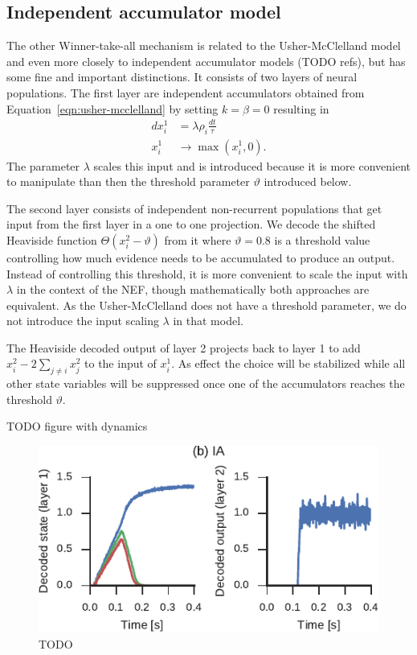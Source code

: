 \documentclass[10pt,letterpaper]{article}
\begin{document}
\subsection{Independent accumulator model}
The other Winner-take-all mechanism is related to the Usher-McClelland model and 
even more closely to independent accumulator models (TODO refs), but has some 
fine and important distinctions. It consists of two layers of neural 
populations. The first layer are independent accumulators obtained from 
Equation~\ref{eqn:usher-mcclelland} by setting $k = \beta = 0$ resulting in
\begin{equation}
    \begin{split}
    dx^1_i &= \lambda \rho_i \frac{dt}{\tau} \\
    x^1_i &\rightarrow \max(x^1_i, 0) \text{.}
    \end{split}
\end{equation}
The parameter $\lambda$ scales this input and is introduced because it is more 
convenient to manipulate than then the threshold parameter $\vartheta$ 
introduced below.

The second layer consists of independent non-recurrent populations that get 
input from the first layer in a one to one projection. We decode the shifted 
Heaviside function $\Theta(x^2_i - \vartheta)$ from it where $\vartheta = 0.8$ 
is a threshold value controlling how much evidence needs to be accumulated to 
produce an output. Instead of controlling this threshold, it is more convenient 
to scale the input with $\lambda$ in the context of the NEF, though 
mathematically both approaches are equivalent. As the Usher-McClelland does not 
have a threshold parameter, we do not introduce the input scaling $\lambda$ in 
that model.

The Heaviside decoded output of layer 2 projects back to layer 1 to add $x^2_i 
- 2\sum_{j \neq i} x^2_j$ to the input of $x^1_i$. As effect the choice will be 
stabilized while all other state variables will be suppressed once one of the 
accumulators reaches the threshold $\vartheta$.

TODO figure with dynamics
\begin{figure}
    \centering
    \includegraphics{figures/indacc}
    \caption{TODO}\label{fig:indacc}
\end{figure}
\end{document}
